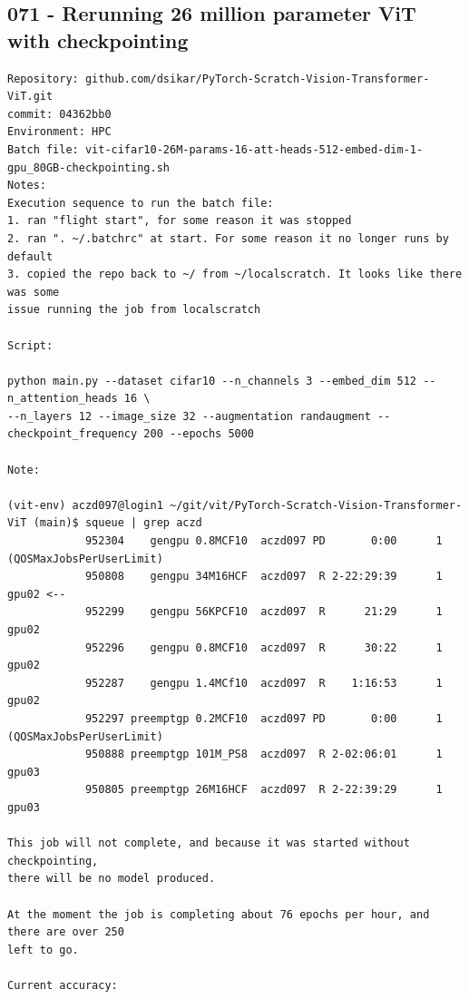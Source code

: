 \subsection{071 - Rerunning 26 million parameter ViT with checkpointing}
\label{app_res:071}
\begin{verbatim}
Repository: github.com/dsikar/PyTorch-Scratch-Vision-Transformer-ViT.git
commit: 04362bb0
Environment: HPC 
Batch file: vit-cifar10-26M-params-16-att-heads-512-embed-dim-1-gpu_80GB-checkpointing.sh
Notes: 
Execution sequence to run the batch file:
1. ran "flight start", for some reason it was stopped
2. ran ". ~/.batchrc" at start. For some reason it no longer runs by default
3. copied the repo back to ~/ from ~/localscratch. It looks like there was some
issue running the job from localscratch

Script:

python main.py --dataset cifar10 --n_channels 3 --embed_dim 512 --n_attention_heads 16 \ 
--n_layers 12 --image_size 32 --augmentation randaugment --checkpoint_frequency 200 --epochs 5000

Note:

(vit-env) aczd097@login1 ~/git/vit/PyTorch-Scratch-Vision-Transformer-ViT (main)$ squeue | grep aczd
            952304    gengpu 0.8MCF10  aczd097 PD       0:00      1 (QOSMaxJobsPerUserLimit)
            950808    gengpu 34M16HCF  aczd097  R 2-22:29:39      1 gpu02 <--
            952299    gengpu 56KPCF10  aczd097  R      21:29      1 gpu02
            952296    gengpu 0.8MCF10  aczd097  R      30:22      1 gpu02
            952287    gengpu 1.4MCf10  aczd097  R    1:16:53      1 gpu02
            952297 preemptgp 0.2MCF10  aczd097 PD       0:00      1 (QOSMaxJobsPerUserLimit)
            950888 preemptgp 101M_PS8  aczd097  R 2-02:06:01      1 gpu03
            950805 preemptgp 26M16HCF  aczd097  R 2-22:39:29      1 gpu03
            
This job will not complete, and because it was started without checkpointing,
there will be no model produced.

At the moment the job is completing about 76 epochs per hour, and there are over 250
left to go.

Current accuracy:


\end{verbatim}
